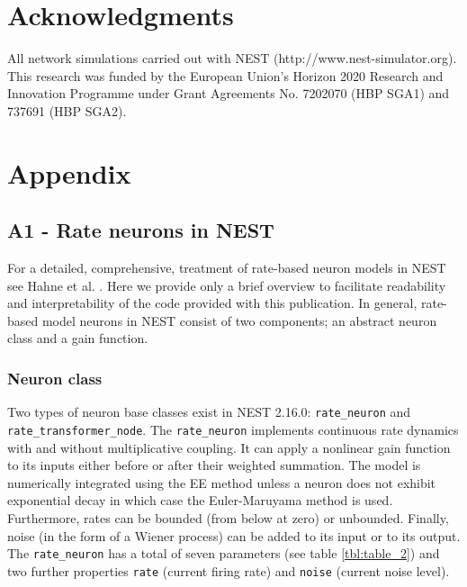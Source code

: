\documentclass[10pt,a4paper,onecolumn]{article}
\begin{document}
\section{Acknowledgments}\label{acknowledgments}

All network simulations carried out with NEST
(http://www.nest-simulator.org). This research was funded by the
European Union's Horizon 2020 Research and Innovation Programme under
Grant Agreements No. 7202070 (HBP SGA1) and 737691 (HBP SGA2).

\section{Appendix}\label{appendix}

\subsection{A1 - Rate neurons in NEST}\label{a1---rate-neurons-in-nest}

For a detailed, comprehensive, treatment of rate-based neuron models in
NEST see Hahne et al. \autocite{Hahne2017}. Here we provide only a brief
overview to facilitate readability and interpretability of the code
provided with this publication. In general, rate-based model neurons in
NEST consist of two components; an abstract neuron class and a gain
function.

\subsubsection{Neuron class}\label{neuron-class}

Two types of neuron base classes exist in NEST 2.16.0:
\texttt{rate\_neuron} and\\
\texttt{rate\_transformer\_node}. The \texttt{rate\_neuron} implements
continuous rate dynamics with and without multiplicative coupling. It
can apply a nonlinear gain function to its inputs either before or after
their weighted summation. The model is numerically integrated using the
EE method unless a neuron does not exhibit exponential decay in which
case the Euler-Maruyama method is used. Furthermore, rates can be
bounded (from below at zero) or unbounded. Finally, noise (in the form
of a Wiener process) can be added to its input or to its output. The
\texttt{rate\_neuron} has a total of seven parameters (see table
\ref{tbl:table_2}) and two further properties \texttt{rate} (current
firing rate) and \texttt{noise} (current noise level).
\end{document}

